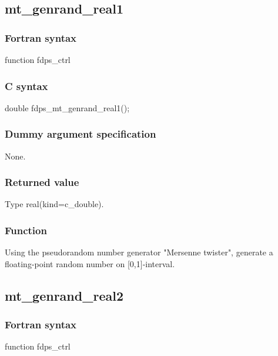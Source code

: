 \subsection{mt\_genrand\_real1}
\subsubsection*{Fortran syntax}
\begin{screen}
\begin{spverbatim}
function fdps_ctrl%
\end{spverbatim}
\end{screen}

\subsubsection*{C syntax}
\begin{screen}
\begin{spverbatim}
double fdps_mt_genrand_real1();
\end{spverbatim}
\end{screen}


\subsubsection*{Dummy argument specification}
None.

\subsubsection*{Returned value}
Type real(kind=c\_double).

\subsubsection*{Function}
Using the pseudorandom number generator "Mersenne twister", generate a floating-point random number on [0,1]-interval.
\clearpage

\subsection{mt\_genrand\_real2}
\subsubsection*{Fortran syntax}
\begin{screen}
\begin{spverbatim}
function fdps_ctrl%
\end{spverbatim}
\end{screen}

